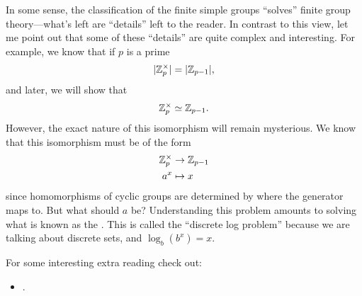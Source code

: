\documentclass{ximera}
\begin{document}
In some sense, the classification of the finite simple groups
``solves'' finite group theory---what's left are ``details'' left to
the reader. In contrast to this view, let me point out that some of
these ``details'' are quite complex and interesting. For example, we
know that if $p$ is a prime
\[
| \mathbb Z_p^\times|=|\mathbb Z_{p-1}|,
\]
and later, we will show that
\[
\mathbb Z_p^\times \simeq \mathbb Z_{p-1}.
\]
However, the exact nature of this isomorphism will remain
mysterious. We know that this isomorphism must be of the form
\begin{align*}
  \mathbb Z_p^\times &\to\mathbb Z_{p-1} \\
  a^x &\mapsto x
\end{align*}
since homomorphisms of cyclic groups are determined by where the
generator maps to. But what should $a$ be?  Understanding this problem
amounts to solving what is known as the . This is called the ``discrete log problem'' because we are talking about discrete sets, and 
$\log_b(b^x) = x$.








For some interesting extra reading check out:
\begin{itemize}
\item {}.


\end{itemize}
\end{document}
